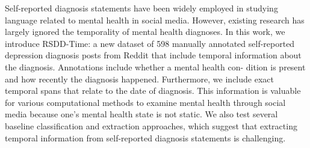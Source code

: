 Self-reported diagnosis statements have been widely employed in studying language related to mental health in social media. However, existing research has largely ignored the temporality of mental health diagnoses. In this work, we introduce RSDD-Time: a new dataset of 598 manually annotated self-reported depression diagnosis posts from Reddit that include temporal information about the diagnosis. Annotations include whether a mental health con- dition is present and how recently the diagnosis happened. Furthermore, we include exact temporal spans that relate to the date of diagnosis. This information is valuable for various computational methods to examine mental health through social media because one's mental health state is not static. We also test several baseline classification and extraction approaches, which suggest that extracting temporal information from self-reported diagnosis statements is challenging.
